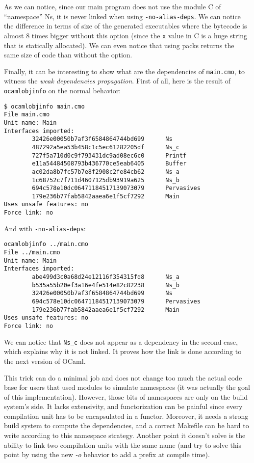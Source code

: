 As we can notice, since our main program does not use the module C of
``namespace'' Ns, it is never linked when using \texttt{-no-alias-deps}. We can
notice the difference in terms of size of the generated executables where the
bytecode is almost 8 times bigger without this option (since the \texttt{x}
value in C is a huge string that is statically allocated). We can even notice
that using packs returns the same size of code than without the option.

Finally, it can be interesting to show what are the dependencies of
\texttt{main.cmo}, to witness the \emph{weak dependencies propagation}. First of
all, here is the result of \texttt{ocamlobjinfo} on the normal behavior:

\begin{verbatim}
$ ocamlobjinfo main.cmo
File main.cmo
Unit name: Main
Interfaces imported:
        32426e00050b7af3f6584864744bd699      Ns
        487292a5ea53b458c1c5ec61282205df      Ns_c
        727f5a710d0c9f793431dc9ad08ec6c0      Printf
        e11a54484508793b436770ce5eab6405      Buffer
        ac02da8b7fc57b7e8f2908c2fe84cb62      Ns_a
        1c68752c7f711d4607125db93919a625      Ns_b
        694c578e10dc06471184517139073079      Pervasives
        179e236b77fab5842aaea6e1f5cf7292      Main
Uses unsafe features: no
Force link: no
\end{verbatim}

And with \texttt{-no-alias-deps}:

\begin{verbatim}
ocamlobjinfo ../main.cmo
File ../main.cmo
Unit name: Main
Interfaces imported:
        abe499d3c0a68d24e12116f354315fd8      Ns_a
        b535a55b20ef3a16e4fe514e82c82238      Ns_b
        32426e00050b7af3f6584864744bd699      Ns
        694c578e10dc06471184517139073079      Pervasives
        179e236b77fab5842aaea6e1f5cf7292      Main
Uses unsafe features: no
Force link: no
\end{verbatim}

We can notice that \texttt{Ns\_c} does not appear as a dependency in the second
case, which explains why it is not linked. It proves how the link is done
according to the next version of OCaml.

This trick can do a minimal job and does not change too much the actual code
base for users that used modules to simulate namespaces (it was actually the
goal of this implementation). However, those bits of namespaces are only on the
build system's side. It lacks extensivity, and functorization can be painful
since every compilation unit has to be encapsulated in a functor. Moreover, it
needs a strong build system to compute the dependencies, and a correct Makefile
can be hard to write according to this namespace strategy. Another point it
doesn't solve is the ability to link two compilation units with the same name
(and try to solve this point by using the new \emph{-o} behavior to add a prefix
at compile time).

